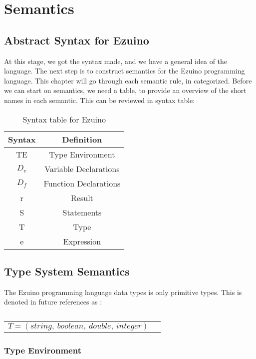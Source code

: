 \chapter{Semantics}
\label{semantics}
\section{Abstract Syntax for Ezuino}
At this stage, we got the syntax made, and we have a general idea of the language. The next step is to construct semantics for the Ezuino programming language. This chapter will go through each semantic rule, in categorized. 
Before we can start on semantics, we need a table, to provide an overview of the short names in each semantic. This can be  reviewed in syntax table: 
\begin{table}[H]
\centering
\label{syntax-table}
\caption{Syntax table for Ezuino}
\begin{tabular}{|c|c|}
\hline
\textbf{Syntax} & \textbf{Definition}   \\ \hline
TE              & Type Environment      \\ \hline
$D_v$           & Variable Declarations \\ \hline
$D_f$           & Function Declarations \\ \hline
r               & Result                \\ \hline
S               & Statements            \\ \hline
T               & Type                  \\ \hline
e               & Expression            \\ \hline
\end{tabular}
\end{table}

\section{Type System Semantics}
The Ezuino programming language data types is only primitive types. This is denoted in future references as :
\begin{table}[H]
    \centering
    \begin{longtable}[c] { r c }
      
        \( { T = (string,\ boolean,\ double,\ integer)} \) \\
    \end{longtable}
    \caption{}\label{type:primitives}
\end{table}

\subsection{Type Environment}

